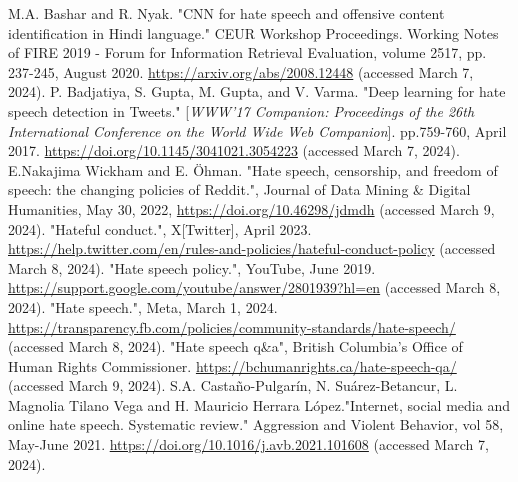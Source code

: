 \documentclass[conference]{IEEEtran}
\begin{document}
\begin{thebibliography}{00}
M.A. Bashar and R. Nyak. "CNN for hate speech and offensive content identification in Hindi language." CEUR Workshop Proceedings. Working Notes of FIRE 2019 - Forum for Information Retrieval Evaluation, volume 2517, pp. 237-245, August 2020. \href{https://arxiv.org/abs/2008.12448}{https://arxiv.org/abs/2008.12448} (accessed March 7, 2024).
P. Badjatiya, S. Gupta, M. Gupta, and V. Varma. "Deep learning for hate speech detection in Tweets." [\textit{WWW'17 Companion: Proceedings of the 26th International Conference on the World Wide Web Companion}]. pp.759-760, April 2017. \href{https://doi.org/10.1145/3041021.3054223}{https://doi.org/10.1145/3041021.3054223} (accessed March 7, 2024).
 E.Nakajima Wickham and E. Öhman. "Hate speech, censorship, and freedom of speech: the changing policies of Reddit.", Journal of Data Mining {\&} Digital Humanities, May 30, 2022, \href{https://doi.org/10.46298/jdmdh}{https://doi.org/10.46298/jdmdh} (accessed March 9, 2024).
"Hateful conduct.", X[Twitter], April 2023. \href{https://help.twitter.com/en/rules-and-policies/hateful-conduct-policy}{https://help.twitter.com/en/rules-and-policies/hateful-conduct-policy} (accessed March 8, 2024).
"Hate speech policy.", YouTube, June 2019. \href{https://support.google.com/youtube/answer/2801939?hl=en}{https://support.google.com/youtube/answer/2801939?hl=en} (accessed March 8, 2024).
"Hate speech.", Meta, March 1, 2024. \href{https://transparency.fb.com/policies/community-standards/hate-speech/}{https://transparency.fb.com/policies/community-standards/hate-speech/} (accessed March 8, 2024).
 "Hate speech q{\&}a", British Columbia's Office of Human Rights Commissioner. \href{https://bchumanrights.ca/hate-speech-qa/}{https://bchumanrights.ca/hate-speech-qa/} (accessed March 9, 2024).
S.A. Castaño-Pulgarín, N. Suárez-Betancur, L. Magnolia Tilano Vega and H. Mauricio Herrara López."Internet, social media and online hate speech. Systematic review." Aggression and Violent Behavior, vol 58, May-June 2021. \href{https://doi.org/10.1016/j.avb.2021.101608}{https://doi.org/10.1016/j.avb.2021.101608} (accessed March 7, 2024).
\end{thebibliography}
\end{document}
